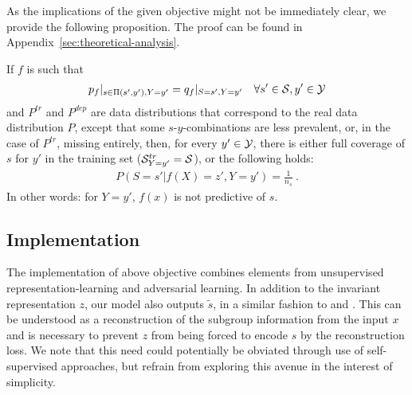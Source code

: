 As the implications of the given objective might not be immediately clear,
we provide the following proposition.
%
The proof can be found in Appendix~\ref{sec:theoretical-analysis}.
%
\begin{theorem}
%
If \(f\) is such that
%
\begin{align}
p_f|_{s\in \Pi(s',y'),Y=y'} = q_f|_{S=s',Y=y'}\quad\forall s'\in{\mathcal{S}}, y' \in{\mathcal{Y}}
\end{align}
%
and \(P^{tr}\) and \(P^{dep}\) are data
distributions that correspond to the real data distribution \(P\),
except that some \(s\)-\(y\)-combinations are less prevalent, or, in the
case of \(P^{tr}\), missing entirely, then, for every
\(y' \in {\mathcal{Y}}\), there is either full coverage of \(s\) for \(y'\)
in the training set (\( {\mathcal{S}}^{tr}_{ Y=y' }={\mathcal{S}} \)), or the
following holds:
%
\begin{align}
P(S=s'|f(X)=z', Y=y')=\frac{1}{n_s}~.
\end{align}
%
In other words: for \(Y=y'\), \(f(x)\) is not predictive of \(s\).
\end{theorem}

\subsection{Implementation}\label{ssec:realisation}
%
The implementation of above objective combines elements from unsupervised representation-learning and
adversarial learning.
In addition to the invariant representation $z$, our model also outputs $\tilde{s}$, in a similar
fashion to \citet{KehBarThoQua20} and \citet{creager2019flexibly}. 
%
This can be understood as a reconstruction of the subgroup information from the input $x$ and is
necessary to prevent $z$ from being forced to encode $s$ by the reconstruction loss.
%
We note that this need could potentially be obviated through use of self-supervised approaches,
but refrain from exploring this avenue in the interest of simplicity.

